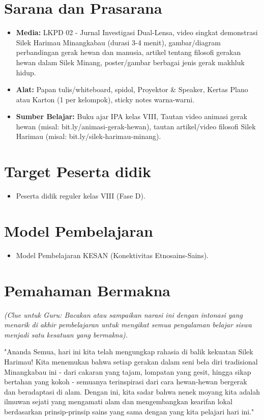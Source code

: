 \documentclass[a4paper,12pt]{article}
\begin{document}
\section{Sarana dan Prasarana}

\begin{itemize}
\item \textbf{Media:} LKPD 02 - Jurnal Investigasi Dual-Lensa, video singkat demonstrasi Silek Harimau Minangkabau (durasi 3-4 menit), gambar/diagram perbandingan gerak hewan dan manusia, artikel tentang filosofi gerakan hewan dalam Silek Minang, poster/gambar berbagai jenis gerak makhluk hidup.
\item \textbf{Alat:} Papan tulis/whiteboard, spidol, Proyektor \& Speaker, Kertas Plano atau Karton (1 per kelompok), sticky notes warna-warni.
\item \textbf{Sumber Belajar:} Buku ajar IPA kelas VIII, Tautan video animasi gerak hewan (misal: bit.ly/animasi-gerak-hewan), tautan artikel/video filosofi Silek Harimau (misal: bit.ly/silek-harimau-minang).
\end{itemize}

\section{Target Peserta didik}

\begin{itemize}
\item Peserta didik reguler kelas VIII (Fase D).
\end{itemize}

\section{Model Pembelajaran}

\begin{itemize}
\item Model Pembelajaran KESAN (Konektivitas Etnosains-Sains).
\end{itemize}

\section{Pemahaman Bermakna}
\textit{(Clue untuk Guru: Bacakan atau sampaikan narasi ini dengan intonasi yang menarik di akhir pembelajaran untuk mengikat semua pengalaman belajar siswa menjadi satu kesatuan yang bermakna).}

\begin{tcolorbox}[sectionbox]
"Ananda Semua, hari ini kita telah mengungkap rahasia di balik kekuatan Silek Harimau! Kita menemukan bahwa setiap gerakan dalam seni bela diri tradisional Minangkabau ini - dari cakaran yang tajam, lompatan yang gesit, hingga sikap bertahan yang kokoh - semuanya terinspirasi dari cara hewan-hewan bergerak dan beradaptasi di alam. Dengan ini, kita sadar bahwa nenek moyang kita adalah ilmuwan sejati yang mengamati alam dan mengembangkan kearifan lokal berdasarkan prinsip-prinsip sains yang sama dengan yang kita pelajari hari ini."
\end{tcolorbox}
\end{document}
